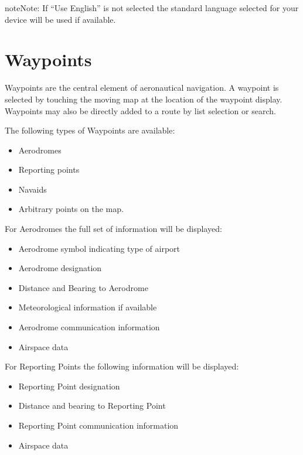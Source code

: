 \documentclass[letterpaper,10pt,english]{sphinxmanual}
\begin{document}
\begin{sphinxadmonition}{note}{Note:}
If “Use English” is not selected the standard language selected for your device will be used if available.
\end{sphinxadmonition}


\section{Waypoints}
\label{\detokenize{01-intro/further_steps:waypoints}}
Waypoints are the central element of aeronautical navigation. A waypoint is selected by touching the moving map at the location of the waypoint display. Waypoints may also be directly added to a route by list selection or search.

The following types of Waypoints are available:
\begin{itemize}
\item {} 
Aerodromes

\item {} 
Reporting points

\item {} 
Navaids

\item {} 
Arbitrary points on the map.

\end{itemize}

For Aerodromes the full set of information will be displayed:
\begin{itemize}
\item {} 
Aerodrome symbol indicating type of airport

\item {} 
Aerodrome designation

\item {} 
Distance and Bearing to Aerodrome

\item {} 
Meteorological information if available

\item {} 
Aerodrome communication information

\item {} 
Airspace data

\end{itemize}

For Reporting Points the following information will be displayed:
\begin{itemize}
\item {} 
Reporting Point designation

\item {} 
Distance and bearing to Reporting Point

\item {} 
Reporting Point communication information

\item {} 
Airspace data

\end{itemize}
\end{document}
